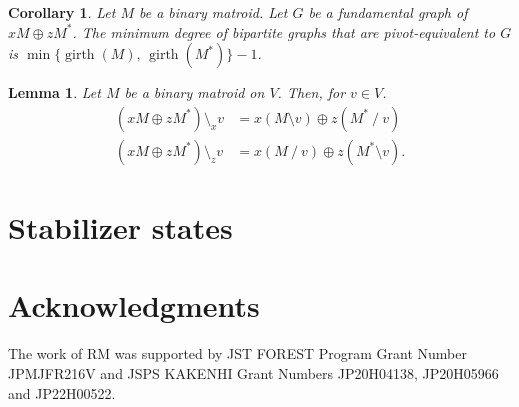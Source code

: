 \documentclass[twoside,10pt]{article}
\DeclareMathOperator{\girth}{girth}
\newtheorem{lemma}[theorem]{Lemma}
\newtheorem{corollary}[theorem]{Corollary}
\theoremstyle{definition}
\theoremstyle{remark}
\begin{document}
\begin{corollary}
Let $M$ be a binary matroid.
Let $G$ be a fundamental graph of $xM\oplus zM^*$.
The minimum degree of bipartite graphs that are pivot-equivalent to $G$ is $\min\{\girth(M),\,\girth(M^*)\}-1$.
\end{corollary}


\begin{lemma}
Let $M$ be a binary matroid on $V$.
Then, for $v\in V$.
\begin{align*}
(xM\oplus zM^*)\setminus_x v &= x(M\setminus v) \oplus z (M^* \mathbin{/} v)\\
(xM\oplus zM^*)\setminus_z v &= x(M\mathbin{/} v) \oplus z (M^* \setminus v).
\end{align*}
\end{lemma}

\section{Stabilizer states}

\section*{Acknowledgments}
The work of RM was supported by JST FOREST Program Grant Number JPMJFR216V and JSPS KAKENHI Grant Numbers JP20H04138, JP20H05966 and JP22H00522.




\end{document}
